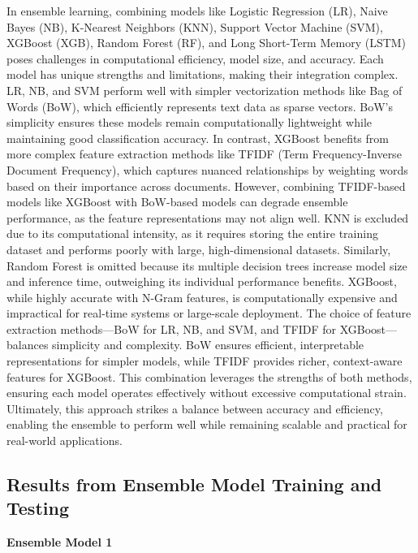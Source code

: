 \noindent
In ensemble learning, combining models like Logistic Regression (LR), Naive Bayes (NB), K-Nearest Neighbors (KNN), Support Vector Machine (SVM), XGBoost (XGB), Random Forest (RF), and Long Short-Term Memory (LSTM) poses challenges in computational efficiency, model size, and accuracy. Each model has unique strengths and limitations, making their integration complex. LR, NB, and SVM perform well with simpler vectorization methods like Bag of Words (BoW), which efficiently represents text data as sparse vectors. BoW’s simplicity ensures these models remain computationally lightweight while maintaining good classification accuracy. In contrast, XGBoost benefits from more complex feature extraction methods like TFIDF (Term Frequency-Inverse Document Frequency), which captures nuanced relationships by weighting words based on their importance across documents. However, combining TFIDF-based models like XGBoost with BoW-based models can degrade ensemble performance, as the feature representations may not align well. KNN is excluded due to its computational intensity, as it requires storing the entire training dataset and performs poorly with large, high-dimensional datasets. Similarly, Random Forest is omitted because its multiple decision trees increase model size and inference time, outweighing its individual performance benefits. XGBoost, while highly accurate with N-Gram features, is computationally expensive and impractical for real-time systems or large-scale deployment. The choice of feature extraction methods—BoW for LR, NB, and SVM, and TFIDF for XGBoost—balances simplicity and complexity. BoW ensures efficient, interpretable representations for simpler models, while TFIDF provides richer, context-aware features for XGBoost. This combination leverages the strengths of both methods, ensuring each model operates effectively without excessive computational strain. Ultimately, this approach strikes a balance between accuracy and efficiency, enabling the ensemble to perform well while remaining scalable and practical for real-world applications.
\pagebreak

\subsection{Results from Ensemble Model Training and Testing}

\vspace{1em}
\noindent
\textbf{Ensemble Model 1}

